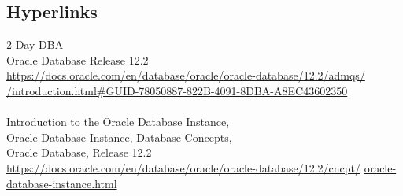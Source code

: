
\subsection{Hyperlinks}

2 Day DBA\\
Oracle Database Release 12.2\\
\href{https://docs.oracle.com/en/database/oracle/oracle-database/12.2/admqs/introduction.html#GUID-78050887-822B-4091-8DBA-A8EC43602350}{https://docs.oracle.com/en/database/oracle/oracle-database/12.2/admqs/}\\
\href{https://docs.oracle.com/en/database/oracle/oracle-database/12.2/admqs/introduction.html#GUID-78050887-822B-4091-8DBA-A8EC43602350}{/introduction.html\#GUID-78050887-822B-4091-8DBA-A8EC43602350}\\
\\
Introduction to the Oracle Database Instance,\\ 
Oracle Database Instance, Database Concepts,\\
Oracle Database, Release 12.2\\
\href{https://docs.oracle.com/en/database/oracle/oracle-database/12.2/cncpt/oracle-database-instance.html}{https://docs.oracle.com/en/database/oracle/oracle-database/12.2/cncpt/}\newline
\href{http://www.google.com}{oracle-database-instance.html}\\
\\
